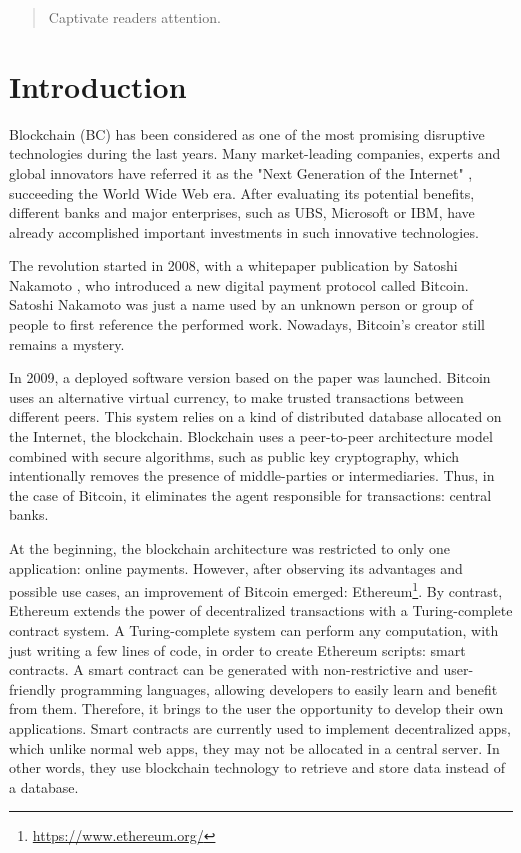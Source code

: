 \begin{abstract}
Captivate readers attention.
\end{abstract}




\chapter{Introduction}

Blockchain (BC) has been considered as one of the most promising disruptive technologies during the last years. Many market-leading companies, experts and global innovators have referred it as the "Next Generation of the Internet" \cite{JenClarck2017}, succeeding the World Wide Web era. After evaluating its potential benefits, different banks and major enterprises, such as UBS, Microsoft or IBM, have already accomplished important investments in such innovative technologies.

The revolution started in 2008, with a whitepaper publication by Satoshi Nakamoto \cite{nakamoto2008bitcoin}, who introduced a new digital payment protocol called Bitcoin. Satoshi Nakamoto was just a name used by an unknown person or group of people to first reference the performed work. Nowadays, Bitcoin's creator still remains a mystery.

In 2009, a deployed software version based on the paper was launched. Bitcoin uses an alternative virtual currency, to make trusted transactions between different peers. This system relies on a kind of distributed database allocated on the Internet, the blockchain. Blockchain uses a peer-to-peer architecture model combined with secure algorithms, such as public key cryptography, which intentionally removes the presence of middle-parties or intermediaries. Thus, in the case of Bitcoin, it eliminates the agent responsible for transactions: central banks.

At the beginning, the blockchain architecture was restricted to only one application: online payments. However, after observing its advantages and possible use cases, an improvement of Bitcoin emerged: Ethereum\footnote{\url{https://www.ethereum.org/}}. By contrast, Ethereum extends the power of decentralized transactions with a Turing-complete contract system. A Turing-complete system can perform any computation, with just writing a few lines of code, in order to create Ethereum scripts: smart contracts. A smart contract can be generated with non-restrictive and user-friendly programming languages, allowing developers to easily learn and benefit from them. Therefore, it brings to the user the opportunity to develop their own applications. Smart contracts are currently used to implement decentralized apps, which unlike normal web apps, they may not be allocated in a central server. In other words, they use blockchain technology to retrieve and store data instead of a database.


